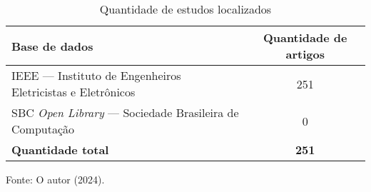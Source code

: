 \begin{table}[H]
\centering
\caption{Quantidade de estudos localizados}
\begin{tabular}{p{10cm}c}
\rowcolor[HTML]{C0C0C0} 
\textbf{Base de dados} & \textbf{Quantidade de artigos} \\
\hline
IEEE — Instituto de Engenheiros Eletricistas e Eletrônicos & 251 \\
SBC \textit{Open Library} — Sociedade Brasileira de Computação & 0 \\
\rowcolor[HTML]{C0C0C0} 
\textbf{Quantidade total} & \textbf{251} \\
\end{tabular}
\vspace{0.2cm}
Fonte: O autor (2024).
\end{table}
